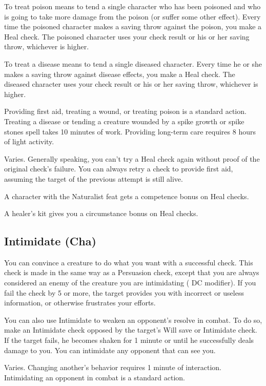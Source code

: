  To treat poison means to tend a single character who has been poisoned and who is going to take more damage from the poison (or suffer some other effect). Every time the poisoned character makes a saving throw against the poison, you make a Heal check. The poisoned character uses your check result or his or her saving throw, whichever is higher.

 To treat a disease means to tend a single diseased character. Every time he or she makes a saving throw against disease effects, you make a Heal check. The diseased character uses your check result or his or her saving throw, whichever is higher.

 Providing first aid, treating a wound, or treating poison is a standard action. Treating a disease or tending a creature wounded by a spike growth or spike stones spell takes 10 minutes of work. Providing long-term care requires 8 hours of light activity.

 Varies. Generally speaking, you can't try a Heal check again without proof of the original check's failure. You can always retry a check to provide first aid, assuming the target of the previous attempt is still alive.

 A character with the Naturalist feat gets a  competence bonus on Heal checks.

A healer's kit gives you a  circumstance bonus on Heal checks.


\subsection{Intimidate (Cha)}
 You can convince a creature to do what you want with a successful check. This check is made in the same way as a Persuasion check, except that you are always considered an enemy of the creature you are intimidating ( DC modifier). If you fail the check by 5 or more, the target provides you with incorrect or useless information, or otherwise frustrates your efforts.

 You can also use Intimidate to weaken an opponent's resolve in combat. To do so, make an Intimidate check opposed by the target's Will save or Intimidate check. If the target fails, he becomes shaken for 1 minute or until he successfully deals damage to you. You can intimidate any opponent that can see you.

 Varies. Changing another's behavior requires 1 minute of interaction. Intimidating an opponent in combat is a standard action.

